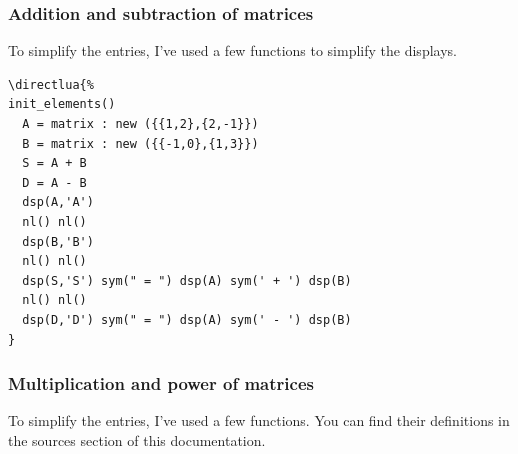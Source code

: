 \subsubsection{Addition and subtraction of matrices} %
\label{ssub:addition_of_matrices}
To simplify the entries, I've used a few functions to simplify the displays.

\vspace{.5em}
\begin{minipage}{.6\textwidth}
\begin{Verbatim}
\directlua{%
init_elements()
  A = matrix : new ({{1,2},{2,-1}}) 
  B = matrix : new ({{-1,0},{1,3}})
  S = A + B
  D = A - B
  dsp(A,'A')
  nl() nl()
  dsp(B,'B')
  nl() nl()
  dsp(S,'S') sym(" = ") dsp(A) sym(' + ') dsp(B)
  nl() nl()
  dsp(D,'D') sym(" = ") dsp(A) sym(' - ') dsp(B)
}
\end{Verbatim}
\end{minipage}
\begin{minipage}{.4\textwidth}
\end{minipage}


\subsubsection{Multiplication and power of matrices} %
\label{ssub:multiplication_of_matrices}
To simplify the entries, I've used a few functions. You can find their definitions in the sources section of this documentation.

